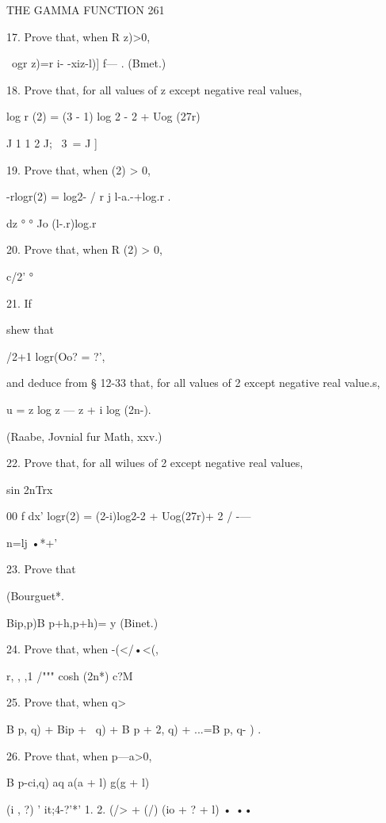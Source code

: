 THE GAMMA FUNCTION 261 

17. Prove that, when R z)>0, 

\ ogr z)=r i- -xiz-l)] f— . (Bmet.) 

18. Prove that, for all values of z except negative real values, 

log r (2) = (3 - 1) log 2 - 2 + Uog (27r) 

J 1   1 2   J; \ 3\  =  J ] 

19. Prove that, when   (2) > 0, 

-rlogr(2) = log2- / r j  l-a.-+log.r . 

dz °   ° Jo (l-.r)log.r  

20. Prove that, when R (2) > 0, 



c/2'  ° 



21. If 

shew that 



/2+1 
logr(Oo?  = ?', 






and deduce from § 12-33 that, for all values of 2 except negative real value.s, 

u = z log z — z + i log (2n-). 

(Raabe, Jovnial fur Math, xxv.) 

22. Prove that, for all wilues of 2 except negative real values, 

sin 2nTrx 



00 f  dx' 
logr(2) = (2-i)log2-2 + Uog(27r)+ 2 / -— 

n=lj •*+' 



23. Prove that 



(Bourguet*. 



Bip,p)B p+h,p+h)=  y (Binet.) 

24. Prove that, when -(</•<(, 

r, , ,1 /""" cosh (2n*) c?M 

25. Prove that, when q>\, 

B p, q) + Bip + \, q) + B p + 2, q) + ...=B p, q- ) . 

26. Prove that, when p—a>0, 

B p-ci,q)   aq a(a + l) g(g + l) 

 (i , ?) ' it;4-?'*' 1. 2. (/> + (/) (io + ? + l) • •• 

